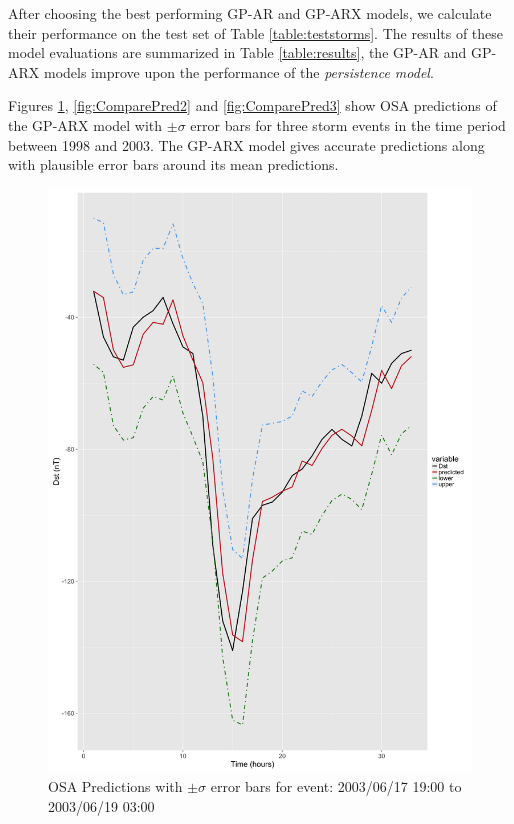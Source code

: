 \documentclass{article}
\begin{document}
After choosing the best performing GP-AR and GP-ARX models, we calculate their performance on the test set of Table \ref{table:teststorms}. The results of these model evaluations are summarized in Table \ref{table:results}, the GP-AR and GP-ARX models improve upon the performance of the \emph{persistence model}.

Figures \ref{fig:ComparePred1}, \ref{fig:ComparePred2} and \ref{fig:ComparePred3} show OSA predictions of the GP-ARX model with $\pm \sigma$ error bars for three storm events in the time period between 1998 and 2003. The GP-ARX model gives accurate predictions along with plausible error bars around its mean predictions.


\begin{figure}[h]
\includegraphics[width=\textwidth]{PredictionsModel1/PredErrBars_Storm43.png}
\caption{OSA Predictions with $\pm \sigma$ error bars for event: 2003/06/17 19:00 to 2003/06/19 03:00}
\label{fig:ComparePred1}
\end{figure}
\end{document}
